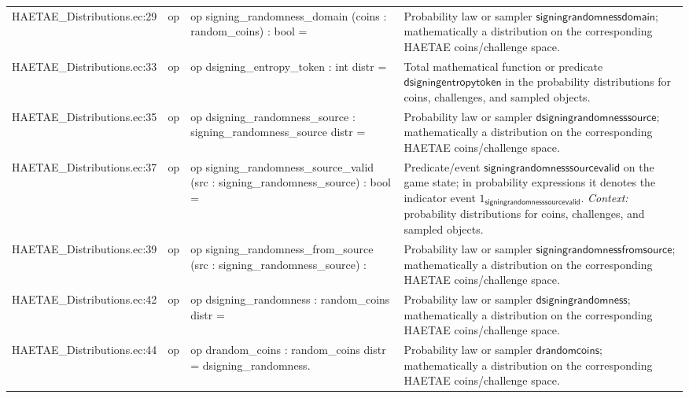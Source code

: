 \documentclass[10pt]{article}
\begin{document}
\begin{longtable}{L{0.11\textwidth}L{0.055\textwidth}L{0.385\textwidth}L{0.41\textwidth}}
HAETAE\_\allowbreak{}Distributions.\allowbreak{}ec:\allowbreak{}29 & op & {\ttfamily\scriptsize op signing\_\allowbreak{}randomness\_\allowbreak{}domain (coins : random\_\allowbreak{}coins) : bool =} & Probability law or sampler $\mathsf{signingrandomnessdomain}$; mathematically a distribution on the corresponding HAETAE coins/challenge space. \\
HAETAE\_\allowbreak{}Distributions.\allowbreak{}ec:\allowbreak{}33 & op & {\ttfamily\scriptsize op dsigning\_\allowbreak{}entropy\_\allowbreak{}token : int distr =} & Total mathematical function or predicate $\mathsf{dsigningentropytoken}$ in the probability distributions for coins, challenges, and sampled objects. \\
HAETAE\_\allowbreak{}Distributions.\allowbreak{}ec:\allowbreak{}35 & op & {\ttfamily\scriptsize op dsigning\_\allowbreak{}randomness\_\allowbreak{}source : signing\_\allowbreak{}randomness\_\allowbreak{}source distr =} & Probability law or sampler $\mathsf{dsigningrandomnesssource}$; mathematically a distribution on the corresponding HAETAE coins/challenge space. \\
HAETAE\_\allowbreak{}Distributions.\allowbreak{}ec:\allowbreak{}37 & op & {\ttfamily\scriptsize op signing\_\allowbreak{}randomness\_\allowbreak{}source\_\allowbreak{}valid (src : signing\_\allowbreak{}randomness\_\allowbreak{}source) : bool =} & Predicate/event $\mathsf{signingrandomnesssourcevalid}$ on the game state; in probability expressions it denotes the indicator event $1_{\mathsf{signingrandomnesssourcevalid}}$. \emph{Context:} probability distributions for coins, challenges, and sampled objects. \\
HAETAE\_\allowbreak{}Distributions.\allowbreak{}ec:\allowbreak{}39 & op & {\ttfamily\scriptsize op signing\_\allowbreak{}randomness\_\allowbreak{}from\_\allowbreak{}source (src : signing\_\allowbreak{}randomness\_\allowbreak{}source) :} & Probability law or sampler $\mathsf{signingrandomnessfromsource}$; mathematically a distribution on the corresponding HAETAE coins/challenge space. \\
HAETAE\_\allowbreak{}Distributions.\allowbreak{}ec:\allowbreak{}42 & op & {\ttfamily\scriptsize op dsigning\_\allowbreak{}randomness : random\_\allowbreak{}coins distr =} & Probability law or sampler $\mathsf{dsigningrandomness}$; mathematically a distribution on the corresponding HAETAE coins/challenge space. \\
HAETAE\_\allowbreak{}Distributions.\allowbreak{}ec:\allowbreak{}44 & op & {\ttfamily\scriptsize op drandom\_\allowbreak{}coins : random\_\allowbreak{}coins distr = dsigning\_\allowbreak{}randomness.} & Probability law or sampler $\mathsf{drandomcoins}$; mathematically a distribution on the corresponding HAETAE coins/challenge space. \\

\end{longtable}
\end{document}
